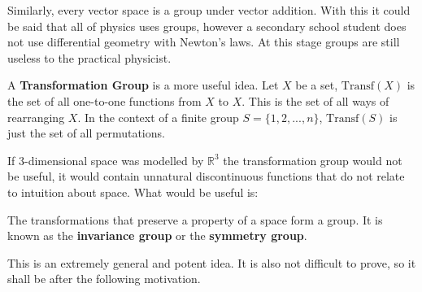 Similarly, every vector space is a group under vector addition. With this it could be said that all of physics uses groups, however a secondary school student does not use differential geometry with Newton's laws. At this stage groups are still useless to the practical physicist.

A \textbf{Transformation Group} is a more useful idea. Let $X$ be a set, $\mathrm{Transf}(X)$ is the set of all one-to-one functions from $X$ to $X$. This is the set of all ways of rearranging $X$. In the context of a finite group $S=\{1,2,...,n\}$, $\mathrm{Transf}(S)$ is just the set of all permutations. 

If $3$-dimensional space was modelled by $\mathbb{R}^3$ the transformation group would not be useful, it would contain unnatural discontinuous functions that do not relate to intuition about space. What would be useful is:
\begin{center}
The transformations that preserve a property of a space form a group. It is known as the \textbf{invariance group} or the \textbf{symmetry group}.
\end{center}
 This is an extremely general and potent idea. It is also not difficult to prove, so it shall be after the following motivation.
 
